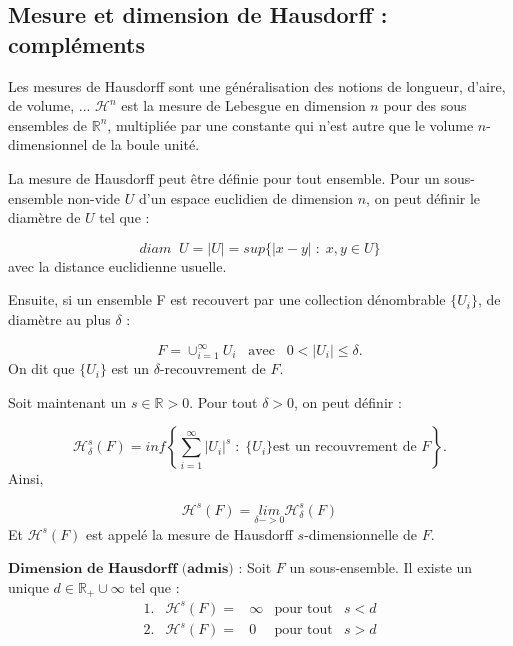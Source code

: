 \subsection{Mesure et dimension de Hausdorff : compléments}
Les mesures de Hausdorff sont une généralisation des notions de longueur, d'aire, de volume, ... $\mathcal{H}^n$ est la mesure de Lebesgue en dimension $n$ pour des sous ensembles de $\mathbb{R}^n$, multipliée par une constante qui n'est autre que le volume $n$-dimensionnel de la boule unité.

\bigskip

La mesure de Hausdorff peut être définie pour tout ensemble. Pour un sous-ensemble non-vide $U$ d'un espace euclidien de dimension $n$, on peut définir le diamètre de $U$ tel que : 

$$diam \; \; U  =  |U| = sup\{ |x-y| \;  :  \; x,y \in U \}$$
avec la distance euclidienne usuelle.

\bigskip

Ensuite, si un ensemble F est recouvert par une collection dénombrable $\{U_i\}$, de diamètre au plus $\delta$ : 

\begin{equation}
F = \cup_{i=1}^{\infty} U_i \; \; \; \text{avec}\; \; \; 0 < |U_i| \leq \delta. 
\end{equation}
 On dit que $\{U_i\}$ est un $\delta$-recouvrement de $F$.
 
\bigskip

Soit maintenant un $s \in \mathbb{R} >0 $. Pour tout $\delta >0$, on peut définir : 

\[ \mathcal{H}_{\delta}^s (F) = inf \left\{ \sum \limits_{i=1}^{\infty} |U_i|^s \; : \; \{U_i\} \text{est un recouvrement de } F\right\}.\]
Ainsi, 

\[ \mathcal{H}^s (F) = \underset{\delta -> 0}{lim} \mathcal{H}_{\delta}^s (F)\] 
Et $\mathcal{H}^s (F)$ est appelé la mesure de Hausdorff $s$-dimensionnelle de $F$.

\bigskip

\begin{theoreme}
$\textbf{Dimension de Hausdorff (admis)}$ : Soit $F$ un sous-ensemble. Il existe un unique  $d \in \mathbb{R}_{+} \cup {\infty}$ tel que : 
$$\begin{array}{rcccl}
1. & \mathcal{H}^s (F) =& \infty & \text{pour tout} &  s<d \\
2. & \mathcal{H}^s (F) =& 0 & \text{pour tout} & s>d 
\end{array}$$
\end{theoreme}

